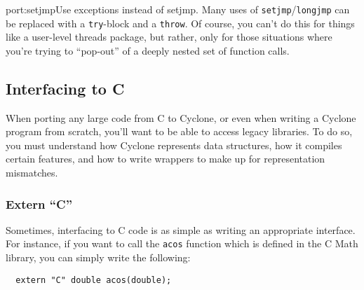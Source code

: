 \begin{porta}{port:setjmp}{Use exceptions instead of setjmp.}
Many uses of \texttt{setjmp}/\texttt{longjmp} can be replaced
with a \texttt{try}-block and a \texttt{throw}.  Of course,
you can't do this for things like a user-level threads package,
but rather, only for those situations where you're trying
to ``pop-out'' of a deeply nested set of function calls.
\end{porta}

\subsection{Interfacing to C}
When porting any large code from C to Cyclone, or even when writing
a Cyclone program from scratch, you'll want to be able to access
legacy libraries.  To do so, you must understand how Cyclone
represents data structures, how it compiles certain features,
and how to write wrappers to make up for representation mismatches.

\subsubsection{Extern ``C''}

Sometimes, interfacing to C code is as simple as writing
an appropriate interface.  For instance, if you want to
call the \texttt{acos} function which is defined in the C
Math library, you can simply write the following:
\begin{verbatim}
  extern "C" double acos(double);
\end{verbatim}

